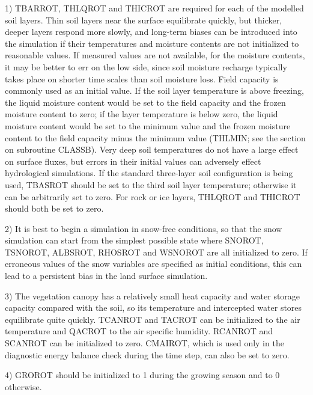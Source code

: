 1) T\+B\+A\+R\+R\+O\+T, T\+H\+L\+Q\+R\+O\+T and T\+H\+I\+C\+R\+O\+T are required for each of the modelled soil layers. Thin soil layers near the surface equilibrate quickly, but thicker, deeper layers respond more slowly, and long-\/term biases can be introduced into the simulation if their temperatures and moisture contents are not initialized to reasonable values. If measured values are not available, for the moisture contents, it may be better to err on the low side, since soil moisture recharge typically takes place on shorter time scales than soil moisture loss. Field capacity is commonly used as an initial value. If the soil layer temperature is above freezing, the liquid moisture content would be set to the field capacity and the frozen moisture content to zero; if the layer temperature is below zero, the liquid moisture content would be set to the minimum value and the frozen moisture content to the field capacity minus the minimum value (T\+H\+L\+M\+I\+N; see the section on subroutine C\+L\+A\+S\+S\+B). Very deep soil temperatures do not have a large effect on surface fluxes, but errors in their initial values can adversely effect hydrological simulations. If the standard three-\/layer soil configuration is being used, T\+B\+A\+S\+R\+O\+T should be set to the third soil layer temperature; otherwise it can be arbitrarily set to zero. For rock or ice layers, T\+H\+L\+Q\+R\+O\+T and T\+H\+I\+C\+R\+O\+T should both be set to zero.

2) It is best to begin a simulation in snow-\/free conditions, so that the snow simulation can start from the simplest possible state where S\+N\+O\+R\+O\+T, T\+S\+N\+O\+R\+O\+T, A\+L\+B\+S\+R\+O\+T, R\+H\+O\+S\+R\+O\+T and W\+S\+N\+O\+R\+O\+T are all initialized to zero. If erroneous values of the snow variables are specified as initial conditions, this can lead to a persistent bias in the land surface simulation.

3) The vegetation canopy has a relatively small heat capacity and water storage capacity compared with the soil, so its temperature and intercepted water stores equilibrate quite quickly. T\+C\+A\+N\+R\+O\+T and T\+A\+C\+R\+O\+T can be initialized to the air temperature and Q\+A\+C\+R\+O\+T to the air specific humidity. R\+C\+A\+N\+R\+O\+T and S\+C\+A\+N\+R\+O\+T can be initialized to zero. C\+M\+A\+I\+R\+O\+T, which is used only in the diagnostic energy balance check during the time step, can also be set to zero.

4) G\+R\+O\+R\+O\+T should be initialized to 1 during the growing season and to 0 otherwise.

